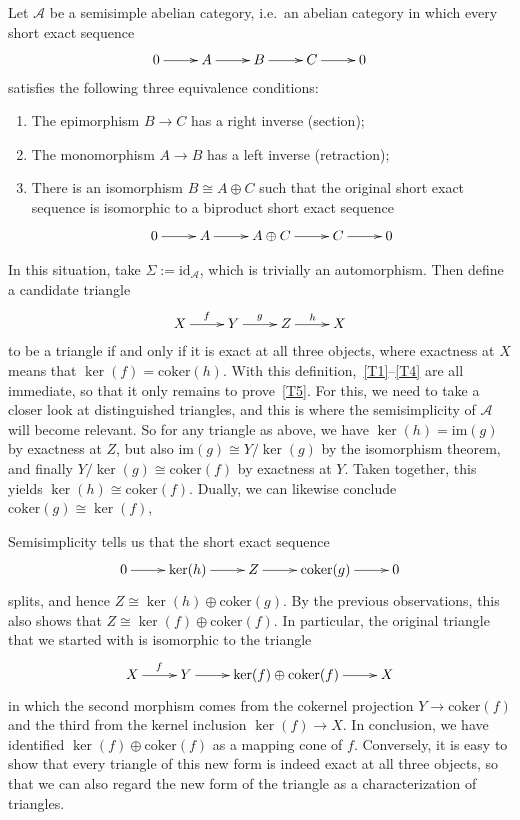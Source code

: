 \documentclass{amsproc}
\theoremstyle{definition}
\begin{document}
Let ${\mathcal{A}}$ be a semisimple abelian category, i.e.~an abelian category in which every short exact sequence
\[
\xymatrix{ 0 \ar[r] & A \ar[r] & B \ar[r] & C \ar[r] & 0 }
\]
satisfies the following three equivalence conditions:
\begin{enumerate}
\item The epimorphism $B{\longrightarrow} C$ has a right inverse (section);
\item The monomorphism $A{\longrightarrow} B$ has a left inverse (retraction);
\item There is an isomorphism $B\cong A\oplus C$ such that the original short exact sequence is isomorphic to a biproduct short exact sequence
\[
\xymatrix{ 0 \ar[r] & A \ar[r] & A\oplus C \ar[r] & C \ar[r] & 0 }
\]
\end{enumerate}
In this situation, take $\Sigma:={\mathrm{id}}_{\mathcal{A}}$, which is trivially an automorphism. Then define a candidate triangle
\[
\xymatrix{ X \ar[r]^f & Y \ar[r]^g & Z \ar[r]^h & X }
\]
to be a triangle if and only if it is exact at all three objects, where exactness at $X$ means that $\ker(f) = {\mathrm{coker}}(h)$. With this definition,~\ref{T1}--\ref{T4} are all immediate, so that it only remains to prove~\ref{T5}. For this, we need to take a closer look at distinguished triangles, and this is where the semisimplicity of ${\mathcal{A}}$ will become relevant. So for any triangle as above, we have $\ker(h)={\mathrm{im}}(g)$ by exactness at $Z$, but also ${\mathrm{im}}(g)\cong Y/\ker(g)$ by the isomorphism theorem, and finally $Y/\ker(g)\cong {\mathrm{coker}}(f)$ by exactness at $Y$. Taken together, this yields $\ker(h)\cong {\mathrm{coker}}(f)$. Dually, we can likewise conclude ${\mathrm{coker}}(g) \cong \ker(f)$,

Semisimplicity tells us that the short exact sequence
\[
\xymatrix{ 0 \ar[r] & \ker(h) \ar[r] & Z \ar[r] & {\mathrm{coker}}(g) \ar[r] & 0 }
\]
splits, and hence $Z\cong \ker(h)\oplus {\mathrm{coker}}(g)$. By the previous observations, this also shows that $Z\cong \ker(f) \oplus {\mathrm{coker}}(f)$. In particular, the original triangle that we started with is isomorphic to the triangle
\begin{displaymath}
\xymatrix{X\ar[r]^f & Y \ar[r] & \ker(f)\oplus{\mathrm{coker}}(f)\ar[r] & X}
\end{displaymath}
in which the second morphism comes from the cokernel projection $Y{\longrightarrow} {\mathrm{coker}}(f)$ and the third from the kernel inclusion $\ker(f){\longrightarrow} X$. In conclusion, we have identified $\ker(f)\oplus{\mathrm{coker}}(f)$ as a mapping cone of $f$. Conversely, it is easy to show that every triangle of this new form is indeed exact at all three objects, so that we can also regard the new form of the triangle as a characterization of triangles.
\end{document}
